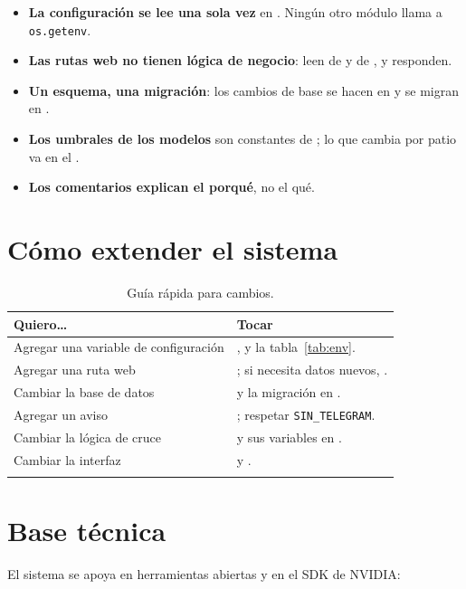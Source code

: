 \begin{itemize}
  \item \textbf{La configuración se lee una sola vez} en .
        Ningún otro módulo llama a \texttt{os.getenv}.
  \item \textbf{Las rutas web no tienen lógica de negocio}: leen de
         y de , y responden.
  \item \textbf{Un esquema, una migración}: los cambios de base se hacen en
         y se migran en .
  \item \textbf{Los umbrales de los modelos} son constantes de ;
        lo que cambia por patio va en el .
  \item \textbf{Los comentarios explican el porqué}, no el qué.
\end{itemize}

\section{Cómo extender el sistema}

\begin{longtable}{@{}L{5cm}L{9cm}@{}}
  \toprule
  \textbf{Quiero\ldots} & \textbf{Tocar} \\
  \midrule
  \endhead
  Agregar una variable de configuración & ,
     y la tabla~\ref{tab:env}. \\
  Agregar una ruta web & ; si necesita datos nuevos,
    . \\
  Cambiar la base de datos &  y la migración en
    . \\
  Agregar un aviso & ; respetar \texttt{SIN\_TELEGRAM}. \\
  Cambiar la lógica de cruce &  y sus variables en
    . \\
  Cambiar la interfaz &  y . \\
  \bottomrule
  \caption{Guía rápida para cambios.}
  \label{tab:extender}
\end{longtable}

\section{Base técnica}

El sistema se apoya en herramientas abiertas y en el SDK de NVIDIA:

